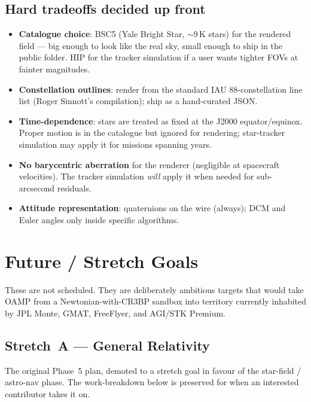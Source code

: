\documentclass[11pt, a4paper]{article}
\begin{document}
\subsection{Hard tradeoffs decided up front}

\begin{itemize}[leftmargin=*]
  \item \textbf{Catalogue choice}: BSC5 (Yale Bright Star, $\sim$9\,K stars)
        for the rendered field --- big enough to look like the real sky,
        small enough to ship in the public folder. HIP for the tracker
        simulation if a user wants tighter FOVs at fainter magnitudes.
  \item \textbf{Constellation outlines}: render from the standard IAU
        88-constellation line list (Roger Sinnott's compilation); ship as
        a hand-curated JSON.
  \item \textbf{Time-dependence}: stars are treated as fixed at the J2000
        equator/equinox. Proper motion is in the catalogue but ignored
        for rendering; star-tracker simulation may apply it for missions
        spanning years.
  \item \textbf{No barycentric aberration} for the renderer (negligible at
        spacecraft velocities). The tracker simulation \emph{will} apply
        it when needed for sub-arcsecond residuals.
  \item \textbf{Attitude representation}: quaternions on the wire
        (always); DCM and Euler angles only inside specific algorithms.
\end{itemize}

\newpage
\section{Future / Stretch Goals}

These are not scheduled. They are deliberately ambitious targets that would
take OAMP from a Newtonian-with-CR3BP sandbox into territory currently
inhabited by JPL Monte, GMAT, FreeFlyer, and AGI/STK Premium.

\subsection{Stretch~A --- General Relativity}

The original Phase~5 plan, demoted to a stretch goal in favour of the
star-field / astro-nav phase. The work-breakdown below is preserved for
when an interested contributor takes it on.
\end{document}
